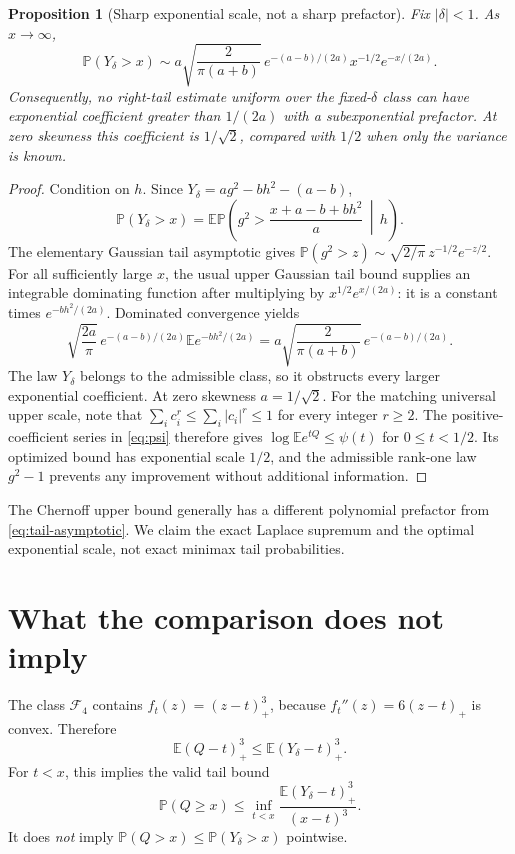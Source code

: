 \documentclass[11pt]{article}
\numberwithin{equation}{section}
\newtheorem{proposition}[theorem]{Proposition}
\theoremstyle{definition}
\theoremstyle{remark}
\newcommand{\E}{\mathbb E}
\newcommand{\Prob}{\mathbb P}
\newcommand{\fourth}{\mathcal F_4}
\begin{document}
\begin{proposition}[Sharp exponential scale, not a sharp prefactor]\label{prop:tail-scale}
Fix $|\delta|<1$. As $x\to\infty$,
\begin{equation}\label{eq:tail-asymptotic}
\Prob(Y_\delta>x)
\sim a\sqrt{\frac{2}{\pi(a+b)}}\,
 e^{-(a-b)/(2a)}x^{-1/2}e^{-x/(2a)}.
\end{equation}
Consequently, no right-tail estimate uniform over the fixed-$\delta$ class can have exponential coefficient greater than $1/(2a)$ with a subexponential prefactor. At zero skewness this coefficient is $1/\sqrt2$, compared with $1/2$ when only the variance is known.
\end{proposition}
\begin{proof}
Condition on $h$. Since $Y_\delta=ag^2-bh^2-(a-b)$,
\[
\Prob(Y_\delta>x)=
\E\Prob\!\left(g^2>\frac{x+a-b+bh^2}{a}\,\middle|\,h\right).
\]
The elementary Gaussian tail asymptotic gives
$\Prob(g^2>z)\sim\sqrt{2/\pi}\,z^{-1/2}e^{-z/2}$.
For all sufficiently large $x$, the usual upper Gaussian tail bound supplies an integrable dominating function after multiplying by $x^{1/2}e^{x/(2a)}$: it is a constant times $e^{-bh^2/(2a)}$. Dominated convergence yields
\[
\sqrt{\frac{2a}{\pi}}\,e^{-(a-b)/(2a)}
\E e^{-bh^2/(2a)}
=a\sqrt{\frac{2}{\pi(a+b)}}\,e^{-(a-b)/(2a)}.
\]
The law $Y_\delta$ belongs to the admissible class, so it obstructs every larger exponential coefficient. At zero skewness $a=1/\sqrt2$. For the matching universal upper scale, note that $\sum_i c_i^r\leq\sum_i|c_i|^r\leq1$ for every integer $r\geq2$. The positive-coefficient series in \eqref{eq:psi} therefore gives $\log\E e^{tQ}\leq\psi(t)$ for $0\leq t<1/2$. Its optimized bound has exponential scale $1/2$, and the admissible rank-one law $g^2-1$ prevents any improvement without additional information.
\end{proof}

The Chernoff upper bound generally has a different polynomial prefactor from \eqref{eq:tail-asymptotic}. We claim the exact Laplace supremum and the optimal exponential scale, not exact minimax tail probabilities.

\section{What the comparison does not imply}
\label{sec:notstoch}

The class $\fourth$ contains $f_t(z)=(z-t)_+^3$, because $f_t''(z)=6(z-t)_+$ is convex. Therefore
\begin{equation}\label{eq:stoploss}
\E(Q-t)_+^3\leq\E(Y_\delta-t)_+^3.
\end{equation}
For $t<x$, this implies the valid tail bound
\begin{equation}\label{eq:stoploss-tail}
\Prob(Q\geq x)\leq
\inf_{t<x}\frac{\E(Y_\delta-t)_+^3}{(x-t)^3}.
\end{equation}
It does \emph{not} imply $\Prob(Q>x)\leq\Prob(Y_\delta>x)$ pointwise.
\end{document}
